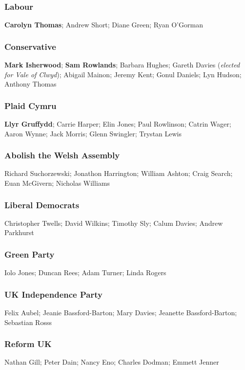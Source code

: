 \begin{resultsiii}
	\subsubsection*{Labour}
	\textbf{Carolyn Thomas}; Andrew Short; Diane Green; Ryan O'Gorman
	
	\subsubsection*{Conservative}
	\textbf{Mark Isherwood}; \textbf{Sam Rowlands}; Barbara Hughes; Gareth Davies (\emph{elected for Vale of Clwyd}); Abigail Mainon; Jeremy Kent; Gonul Daniels; Lyn Hudson; Anthony Thomas
	
	\subsubsection*{Plaid Cymru}
	\textbf{Llyr Gruffydd}; Carrie Harper; Elin Jones; Paul Rowlinson; Catrin Wager; Aaron Wynne; Jack Morris; Glenn Swingler; Trystan Lewis
	
	\subsubsection*{Abolish the Welsh Assembly}
	Richard Suchorzewski; Jonathon Harrington; William Ashton; Craig Search; Euan McGivern; Nicholas Williams
	
	\subsubsection*{Liberal Democrats}
	Christopher Twells; David Wilkins; Timothy Sly; Calum Davies; Andrew Parkhurst
	
	\subsubsection*{Green Party}
	Iolo Jones; Duncan Rees; Adam Turner; Linda Rogers
	
	\subsubsection*{UK Independence Party}
	Felix Aubel; Jeanie Bassford-Barton; Mary Davies; Jeanette Bassford-Barton; Sebastian Rosss
	
	\subsubsection*{Reform UK}
	Nathan Gill; Peter Dain; Nancy Eno; Charles Dodman; Emmett Jenner
	

\end{resultsiii}
